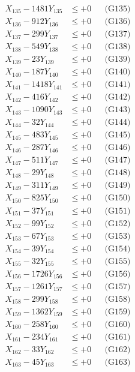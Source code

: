 \documentclass[a4paper,10pt]{article}
\begin{document}
{\begin{align}
X_{135} - 1481Y_{135} &\leq +0 && \text{(G135)} \\
X_{136} - 912Y_{136} &\leq +0 && \text{(G136)} \\
X_{137} - 299Y_{137} &\leq +0 && \text{(G137)} \\
X_{138} - 549Y_{138} &\leq +0 && \text{(G138)} \\
X_{139} - 23Y_{139} &\leq +0 && \text{(G139)} \\
X_{140} - 187Y_{140} &\leq +0 && \text{(G140)} \\
\allowbreak
X_{141} - 1418Y_{141} &\leq +0 && \text{(G141)} \\
X_{142} - 416Y_{142} &\leq +0 && \text{(G142)} \\
X_{143} - 1090Y_{143} &\leq +0 && \text{(G143)} \\
X_{144} - 32Y_{144} &\leq +0 && \text{(G144)} \\
X_{145} - 483Y_{145} &\leq +0 && \text{(G145)} \\
X_{146} - 287Y_{146} &\leq +0 && \text{(G146)} \\
X_{147} - 511Y_{147} &\leq +0 && \text{(G147)} \\
X_{148} - 29Y_{148} &\leq +0 && \text{(G148)} \\
X_{149} - 311Y_{149} &\leq +0 && \text{(G149)} \\
X_{150} - 825Y_{150} &\leq +0 && \text{(G150)} \\
\allowbreak
X_{151} - 37Y_{151} &\leq +0 && \text{(G151)} \\
X_{152} - 99Y_{152} &\leq +0 && \text{(G152)} \\
X_{153} - 67Y_{153} &\leq +0 && \text{(G153)} \\
X_{154} - 39Y_{154} &\leq +0 && \text{(G154)} \\
X_{155} - 32Y_{155} &\leq +0 && \text{(G155)} \\
X_{156} - 1726Y_{156} &\leq +0 && \text{(G156)} \\
X_{157} - 1261Y_{157} &\leq +0 && \text{(G157)} \\
X_{158} - 299Y_{158} &\leq +0 && \text{(G158)} \\
X_{159} - 1362Y_{159} &\leq +0 && \text{(G159)} \\
X_{160} - 258Y_{160} &\leq +0 && \text{(G160)} \\
\allowbreak
X_{161} - 234Y_{161} &\leq +0 && \text{(G161)} \\
X_{162} - 33Y_{162} &\leq +0 && \text{(G162)} \\
X_{163} - 45Y_{163} &\leq +0 && \text{(G163)} \\

\end{align}}
\end{document}
